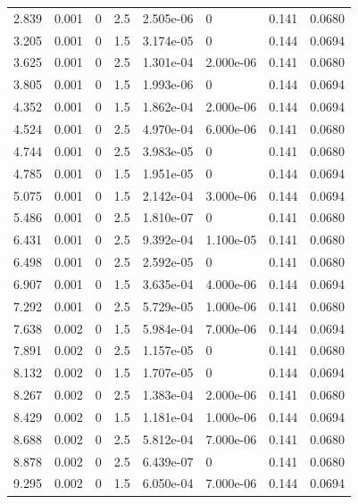 \documentclass[preview]{standalone}
\begin{document}
{{\begin{tabular}{L{1.2cm}C{1.2cm} C{0.3cm}C{0.5cm} C{1.4cm}C{1.4cm} C{1.4cm}C{1.4cm}}
  2.839  &  0.001  & 0     & 2.5 &  2.505e-06  & 0  & 0.141 &  0.0680   \\ 
  3.205  &  0.001  & 0     & 1.5 &  3.174e-05  & 0  & 0.144 &  0.0694   \\ 
  3.625  &  0.001  & 0     & 2.5 &  1.301e-04  & 2.000e-06  & 0.141 &  0.0680   \\ 
  3.805  &  0.001  & 0     & 1.5 &  1.993e-06  & 0  & 0.144 &  0.0694   \\ 
  4.352  &  0.001  & 0     & 1.5 &  1.862e-04  & 2.000e-06  & 0.144 &  0.0694   \\ 
  4.524  &  0.001  & 0     & 2.5 &  4.970e-04  & 6.000e-06  & 0.141 &  0.0680   \\ 
  4.744  &  0.001  & 0     & 2.5 &  3.983e-05  & 0  & 0.141 &  0.0680   \\ 
  4.785  &  0.001  & 0     & 1.5 &  1.951e-05  & 0  & 0.144 &  0.0694   \\ 
  5.075  &  0.001  & 0     & 1.5 &  2.142e-04  & 3.000e-06  & 0.144 &  0.0694   \\ 
  5.486  &  0.001  & 0     & 2.5 &  1.810e-07  & 0  & 0.141 &  0.0680   \\ 
  6.431  &  0.001  & 0     & 2.5 &  9.392e-04  & 1.100e-05  & 0.141 &  0.0680   \\ 
  6.498  &  0.001  & 0     & 2.5 &  2.592e-05  & 0  & 0.141 &  0.0680   \\ 
  6.907  &  0.001  & 0     & 1.5 &  3.635e-04  & 4.000e-06  & 0.144 &  0.0694   \\ 
  7.292  &  0.001  & 0     & 2.5 &  5.729e-05  & 1.000e-06  & 0.141 &  0.0680   \\ 
  7.638  &  0.002  & 0     & 1.5 &  5.984e-04  & 7.000e-06  & 0.144 &  0.0694   \\ 
  7.891  &  0.002  & 0     & 2.5 &  1.157e-05  & 0  & 0.141 &  0.0680   \\ 
  8.132  &  0.002  & 0     & 1.5 &  1.707e-05  & 0  & 0.144 &  0.0694   \\ 
  8.267  &  0.002  & 0     & 2.5 &  1.383e-04  & 2.000e-06  & 0.141 &  0.0680   \\ 
  8.429  &  0.002  & 0     & 1.5 &  1.181e-04  & 1.000e-06  & 0.144 &  0.0694   \\ 
  8.688  &  0.002  & 0     & 2.5 &  5.812e-04  & 7.000e-06  & 0.141 &  0.0680   \\ 
  8.878  &  0.002  & 0     & 2.5 &  6.439e-07  & 0  & 0.141 &  0.0680   \\ 
  9.295  &  0.002  & 0     & 1.5 &  6.050e-04  & 7.000e-06  & 0.144 &  0.0694   \\ 

\end{tabular}}}
\end{document}
